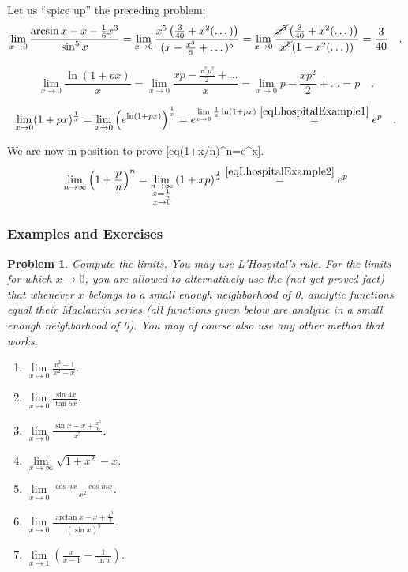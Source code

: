 \documentclass[12pt]{book}
\newtheorem{problem}[theorem]{Problem}
\begin{document}
Let us ``spice up'' the preceding problem:
\[
\lim\limits_{x\to 0} \frac{\arcsin x- x- \frac{1}6x^3}{\sin^{5} x}= \lim\limits_{x\to 0} \frac{x^5 \left(\frac{3}{40}+x^2(\dots)\right)}{(x-\frac{x^3}6+\dots)^5}=  \lim\limits_{x\to 0} \frac{\cancel{x^5} \left(\frac{3}{40}+x^2(\dots)\right)}{\cancel{x^5}(1-x^2(\dots))}= \frac{3}{40}\quad .
\]

\begin{equation}\label{eqLhospitalExample1}
\lim\limits_{x\to 0}\frac{\ln(1+px)}{x}=\lim \limits_{x\to 0} \frac{xp- \frac{x^2p^2}{2}+\dots  }{x}= \lim \limits_{x\to 0} p- \frac{xp^2}{2}+\dots = p\quad .
\end{equation}

\begin{equation}\label{eqLhospitalExample2}
\lim\limits_{x\to 0}(1+px)^{\frac1x}= \lim\limits_{x\to 0} \left(e^{\ln (1+px)}\right)^{\frac1x} = e^{\lim\limits_{x\to 0}\frac{1}x\ln (1+px)} \stackrel{\eqref{eqLhospitalExample1}}{=}e^{p}\quad .
\end{equation}

We are now in position to prove \eqref{eq(1+x/n)^n=e^x}.
\[
\lim\limits_{n\to \infty} \left(1+\frac{p}{n}\right)^n= \lim_{\substack{n\to \infty \\ x=\frac{1}{n}\\x\to 0}} \left(1+xp\right)^{\frac{1}{x}} \stackrel{\eqref{eqLhospitalExample2}}{=}e^p
\]
\subsubsection{Examples and Exercises}
\begin{problem}
Compute the limits. You may use L'Hospital's rule. For the limits for which $x\to 0$, you are allowed to alternatively use the (not yet proved fact) that whenever $x$ belongs to a small enough neighborhood of 0, analytic functions equal their Maclaurin series (all functions given below are analytic in a small enough neighborhood of 0). You may of course also use any other method that works.
\begin{enumerate}
\item $\lim\limits_{x\to 0} \frac{x^2-1}{x^2-x}$.
\item $\lim\limits_{x\to 0} \frac{\sin 4 x}{\tan 5x}$.
\item $\lim\limits_{x\to 0} \frac{\sin x - x +\frac{x^3}{6}}{x^5}$.
\item $\lim\limits_{x\to \infty} \sqrt{1+x^2} - x$.
\item $\lim\limits_{x\to 0} \frac{\cos n x - \cos mx }{x^2}$.
\item $\lim\limits_{x\to 0} \frac{\arctan x - x+ \frac{x^3}{3} }{(\sin x)^5}$.
\item $\lim\limits_{x\to 1}\left(\frac{x}{x-1}- \frac{1}{\ln x} \right)$.
\end{enumerate}
\end{problem}
\end{document}
